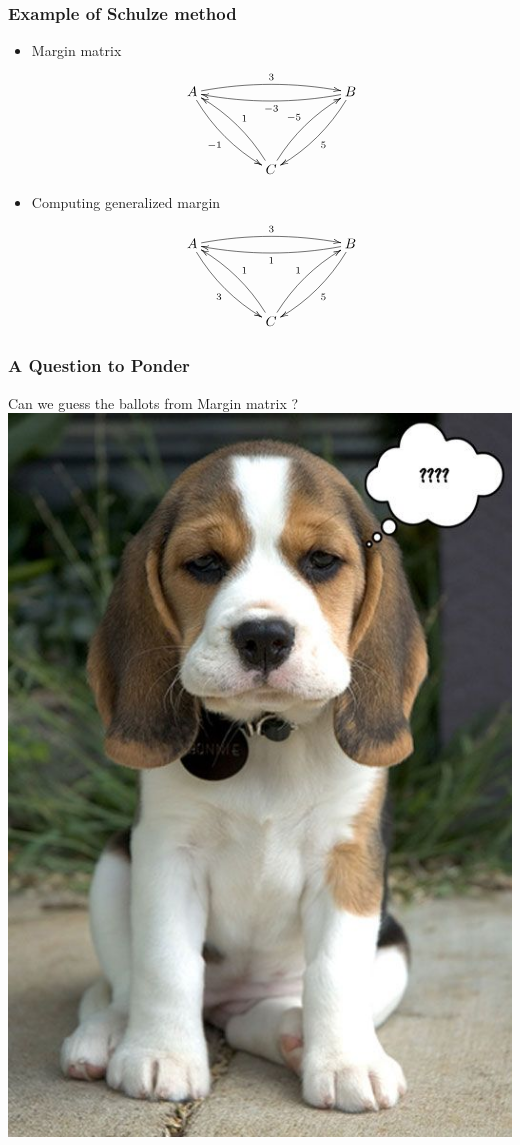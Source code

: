 \documentclass{beamer}
\begin{document}
\begin{frame}
\frametitle{Example of Schulze method}
\begin{itemize}
\item Margin matrix
\[
\xymatrix@R=10ex@C=10ex{
A \ar@/^/[rr]^{3} \ar@/_/[dr]_{-1} & & B \ar@/^/[ll]^{-3}
\ar@/^/[dl]^5 \\
& C \ar@/_/[ul]_{1} \ar@/^/[ur]^{-5}
} \] \pause
\item Computing generalized margin
\[\xymatrix@R=10ex@C=10ex{
A \ar@/^/[rr]^{3} \ar@/_/[dr]_{3} & & B \ar@/^/[ll]^{1}
\ar@/^/[dl]^5 \\
& C \ar@/_/[ul]_{1} \ar@/^/[ur]^{1}
}\]
\end{itemize}
\end{frame}

\begin{frame}
\frametitle{A Question to Ponder}

\begin{center}
Can we guess the ballots from Margin matrix ? 
\includegraphics[scale=0.3]{pondering.jpg}
\end{center}
\end{frame}
\end{document}
